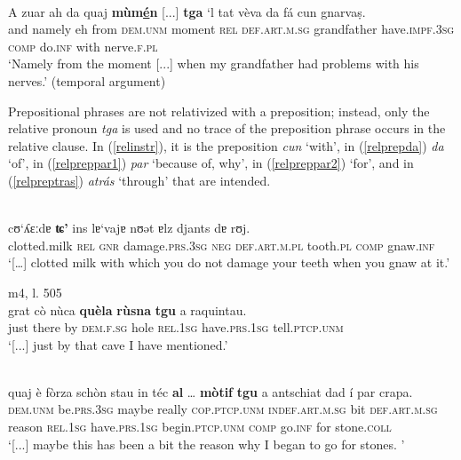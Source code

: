 \ea\label{}
\\
\gll A zuar ah da quaj \textbf{mùm\underline{é}n} [...] \textbf{tga} `l tat vèva da fá cun gnarvaṣ. \\
and namely eh from \textsc{dem.unm} moment {} \textsc{rel} \textsc{def.art.m.sg} grandfather have.\textsc{impf.3sg} \textsc{comp} do.\textsc{inf} with nerve.\textsc{f.pl} \\ 
\glt `Namely from the moment [...] when my grandfather had problems with his nerves.' (temporal argument)
\z

Prepositional phrases are not relativized with a preposition; instead, only the relative pronoun \textit{tga} is used and no trace of the preposition phrase occurs in the relative clause. In (\ref{relinstr}), it is the preposition \textit{cun} `with', in (\ref{relprepda}) \textit{da} `of', in (\ref{relpreppar1}) \textit{par} `because of, why', in (\ref{relpreppar2}) `for', and in (\ref{relpreptras}) \textit{atrás} `through' that are intended.

\ea\label{relinstr}
\\
\gll    […] cʊ‘ʎɛːdɐ \textbf{ʨ'} ins lɐ‘vajɐ nʊǝt ɐlz djants dɐ rʊj.\\
{} clotted.milk \textsc{rel} \textsc{gnr} damage.\textsc{prs.3sg} \textsc{neg} \textsc{def.art.m.pl} tooth.\textsc{pl} \textsc{comp} gnaw.\textsc{inf} \\
\glt `[…] clotted milk with which you do not damage your teeth when you gnaw at it.'
\z

\ea\label{relprepda}
 {m4, l. 505}\\
\gll [...] grat cò nùca \textbf{quèla} \textbf{rùsna} \textbf{tgu} a raquintau.\\
{} just there by \textsc{dem.f.sg} hole \textsc{rel.1sg} have.\textsc{prs.1sg} tell.\textsc{ptcp.unm}\\  
\glt `[...] just by that cave I have mentioned.'
\z

\ea\label{relpreppar1}
\\
\gll  [...] quaj è fòrza schòn stau in téc \textbf{al} … \textbf{mòtif} \textbf{tgu} a antschiat dad í par crapa.\\
{} \textsc{dem.unm} be.\textsc{prs.3sg} maybe really  \textsc{cop.ptcp.unm} \textsc{indef.art.m.sg} bit \textsc{def.art.m.sg} {} reason \textsc{rel.1sg} have.\textsc{prs.1sg} begin.\textsc{ptcp.unm} \textsc{comp} go.\textsc{inf} for stone.\textsc{coll}\\
\glt `[...] maybe this has been a bit the reason why I began to go for stones. '
\z

